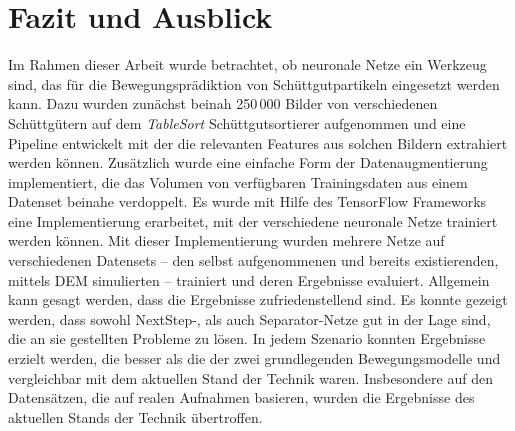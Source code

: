 \chapter{Fazit und Ausblick}
\label{cap:fazit}

Im Rahmen dieser Arbeit wurde betrachtet, ob neuronale Netze ein Werkzeug sind, das für die Bewegungsprädiktion von Schüttgutpartikeln eingesetzt werden kann.
Dazu wurden zunächst beinah 250\,000 Bilder von verschiedenen Schüttgütern auf dem \textit{TableSort} Schüttgutsortierer aufgenommen 
und eine Pipeline entwickelt mit der die relevanten Features aus solchen Bildern extrahiert werden können.
Zusätzlich wurde eine einfache Form der Datenaugmentierung implementiert, die das Volumen von verfügbaren Trainingsdaten aus einem Datenset beinahe verdoppelt.
Es wurde mit Hilfe des TensorFlow Frameworks eine Implementierung erarbeitet, mit der verschiedene neuronale Netze trainiert werden können.
Mit dieser Implementierung wurden mehrere Netze auf verschiedenen Datensets -- den selbst aufgenommenen und bereits existierenden, mittels DEM simulierten -- trainiert und deren Ergebnisse evaluiert.
Allgemein kann gesagt werden, dass die Ergebnisse zufriedenstellend sind.
Es konnte gezeigt werden, dass sowohl NextStep-, als auch Separator-Netze gut in der Lage sind, die an sie gestellten Probleme zu lösen.
In jedem Szenario konnten Ergebnisse erzielt werden, die besser als die der zwei grundlegenden Bewegungsmodelle
und vergleichbar mit dem aktuellen Stand der Technik waren.
Insbesondere auf den Datensätzen, die auf realen Aufnahmen basieren, wurden die Ergebnisse des aktuellen Stands der Technik übertroffen.






